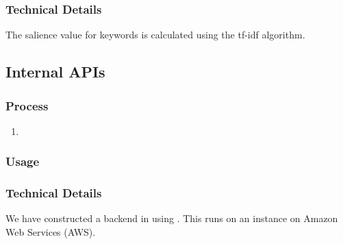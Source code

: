 \subsubsection{Technical Details}
The salience value for keywords is calculated using the tf-idf algorithm. 

\subsection{Internal APIs}
\subsubsection{Process}
\begin{enumerate}
    \item{}
\end{enumerate}

\subsubsection{Usage}

\subsubsection{Technical Details}
We have constructed a backend in  using . This runs on an  instance on Amazon Web Services (AWS). 
\newpage
